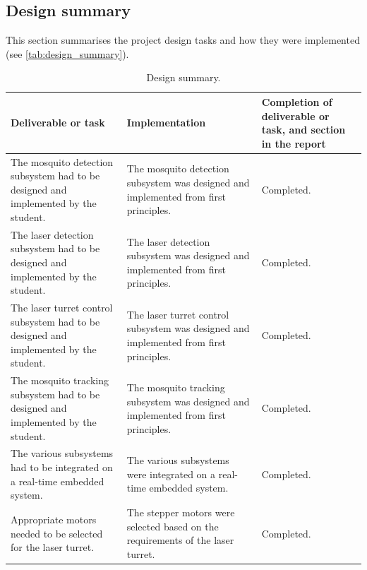 \subsection{Design summary}

This section summarises the project design tasks and how they were
implemented (see \autoref{tab:design_summary}).

\begin{table}[H]
    \centering
    \begin{tabularx}{\textwidth}{|X|X|X|}
        \hline
        \textbf{Deliverable or task}                                                           & \textbf{Implementation} &
        \textbf{Completion of deliverable or task, and section in the report}
        \\
        \hline
        The mosquito detection subsystem had to be designed and implemented by the student.    &
        The mosquito detection subsystem was designed and implemented from first principles.   &
        Completed.
        \\
        \hline
        The laser detection subsystem had to be designed and implemented by the student.       &
        The laser detection subsystem was designed and implemented from first principles.      &
        Completed.
        \\
        \hline
        The laser turret control subsystem had to be designed and implemented by the student.  &
        The laser turret control subsystem was designed and implemented from first principles. &
        Completed.
        \\
        \hline
        The mosquito tracking subsystem had to be designed and implemented by the student.     &
        The mosquito tracking subsystem was designed and implemented from first principles.    &
        Completed.
        \\
        \hline
        The various subsystems had to be integrated on a real-time embedded system.            &
        The various subsystems were integrated on a real-time embedded system.                 &
        Completed.
        \\
        \hline
        Appropriate motors needed to be selected for the laser turret.                         &
        The stepper motors were selected based on the requirements of the laser turret.        &
        Completed.
        \\
        \hline
    \end{tabularx}
    \caption{Design summary.}
    \label{tab:design_summary}
\end{table}


